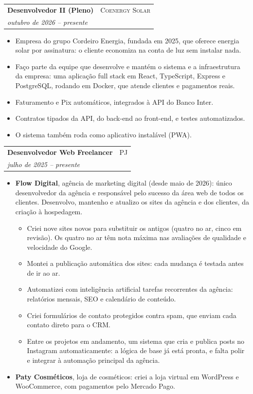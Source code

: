 \documentclass[a4paper,11pt]{article}
\makeatletter
\newcommand{\datedsubsection}[4]{%
  \vspace{0.8ex}
  \noindent\begin{tabular*}{\textwidth}{@{\extracolsep{\fill}} l r@{}}
    \textbf{#3} & \scshape{#2} \\
    \textit{#1} & \\
  \end{tabular*}\par
  \vspace{0.5ex}
  \justifying\noindent
  #4\par
}
\makeatother
\begin{document}
\datedsubsection{outubro de 2026 -- presente}{Coenergy Solar}%
{Desenvolvedor II (Pleno)}{
  \begin{itemize}
    \item Empresa do grupo Cordeiro Energia, fundada em 2025, que oferece
    energia solar por assinatura: o cliente economiza na conta de luz sem
    instalar nada.
    \item Faço parte da equipe que desenvolve e mantém o sistema e a
    infraestrutura da empresa: uma aplicação full stack em React, TypeScript,
    Express e PostgreSQL, rodando em Docker, que atende clientes e pagamentos
    reais.
    \item Faturamento e Pix automáticos, integrados à API do Banco Inter.
    \item Contratos tipados da API, do back-end ao front-end, e testes
    automatizados.
    \item O sistema também roda como aplicativo instalável (PWA).
  \end{itemize}
}

\datedsubsection{julho de 2025 -- presente}{PJ}%
{Desenvolvedor Web Freelancer}{
  \begin{itemize}
    \item \textbf{Flow Digital}, agência de marketing digital (desde maio de
    2026): único desenvolvedor da agência e responsável pelo sucesso da área
    web de todos os clientes.  Desenvolvo, mantenho e atualizo os sites da
    agência e dos clientes, da criação à hospedagem.
    \begin{itemize}
      \item Criei nove sites novos para substituir os antigos (quatro no ar,
      cinco em revisão).  Os quatro no ar têm nota máxima nas avaliações de
      qualidade e velocidade do Google.
      \item Montei a publicação automática dos sites: cada mudança é testada
      antes de ir ao ar.
      \item Automatizei com inteligência artificial tarefas recorrentes da
      agência: relatórios mensais, SEO e calendário de conteúdo.
      \item Criei formulários de contato protegidos contra spam, que enviam
      cada contato direto para o CRM.
      \item Entre os projetos em andamento, um sistema que cria e publica
      posts no Instagram automaticamente: a lógica de base já está pronta, e
      falta polir e integrar à automação principal da agência.
    \end{itemize}
    \item \textbf{Paty Cosméticos}, loja de cosméticos: criei a loja virtual em
    WordPress e WooCommerce, com pagamentos pelo Mercado Pago.
  \end{itemize}
}
\end{document}
